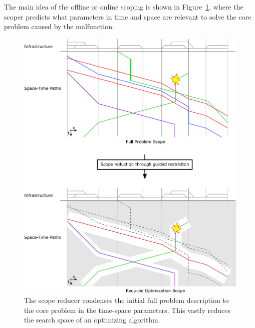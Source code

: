 \documentclass{article}
\begin{document}
The main idea of the offline or online scoping is shown in Figure~\ref{fig:introduction_time_space}, where the scoper predicts what parameters in time and space are relevant to solve the core problem caused by the malfunction.

%
\begin{figure}[hbtp]
	\centering
  \includegraphics[width=\textwidth]{Figures/rsp_rescheduling_rsp.pdf}
	\caption{The scope reducer condenses the initial full problem description to the core problem in the time-space parameters. This vastly reduces the search space of an optimizing algorithm.}
	\label{fig:introduction_time_space}
\end{figure}
\end{document}
